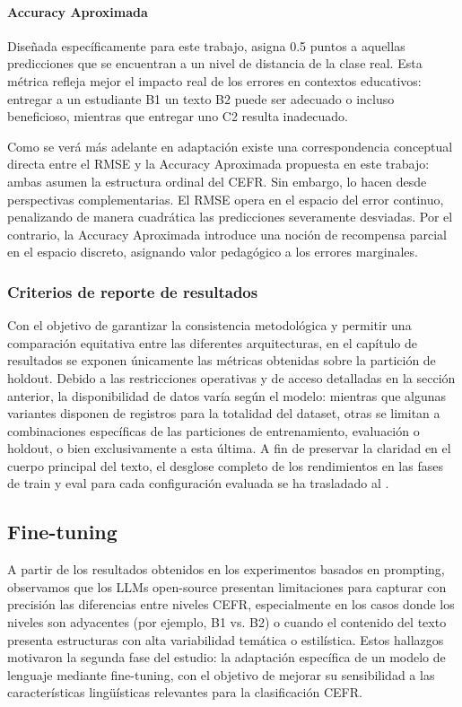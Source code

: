 \paragraph{Accuracy Aproximada}
Diseñada específicamente para este trabajo, asigna 0.5 puntos a aquellas predicciones que se encuentran a un nivel de distancia de la clase real. Esta métrica refleja mejor el impacto real de los errores en contextos educativos: entregar a un estudiante B1 un texto B2 puede ser adecuado o incluso beneficioso, mientras que entregar uno C2 resulta inadecuado.

Como se verá más adelante en  adaptación existe una correspondencia conceptual directa entre el RMSE y la Accuracy Aproximada propuesta en este trabajo: ambas asumen la estructura ordinal del CEFR. Sin embargo, lo hacen desde perspectivas complementarias. El RMSE opera en el espacio del error continuo, penalizando de manera cuadrática las predicciones severamente desviadas. Por el contrario, la Accuracy Aproximada introduce una noción de recompensa parcial en el espacio discreto, asignando valor pedagógico a los errores marginales.

\subsubsection*{Criterios de reporte de resultados}
Con el objetivo de garantizar la consistencia metodológica y permitir una comparación equitativa entre las diferentes arquitecturas, en el capítulo de resultados se exponen únicamente las métricas obtenidas sobre la partición de holdout. Debido a las restricciones operativas y de acceso detalladas en la sección anterior, la disponibilidad de datos varía según el modelo: mientras que algunas variantes disponen de registros para la totalidad del dataset, otras se limitan a combinaciones específicas de las particiones de entrenamiento, evaluación o holdout, o bien exclusivamente a esta última. A fin de preservar la claridad en el cuerpo principal del texto, el desglose completo de los rendimientos en las fases de train y eval para cada configuración evaluada se ha trasladado al .

\subsection{Fine-tuning}\label{subsection:clas_finetuning}
A partir de los resultados obtenidos en los experimentos basados en prompting, observamos que los LLMs open-source presentan limitaciones para capturar con precisión las diferencias entre niveles CEFR, especialmente en los casos donde los niveles son adyacentes (por ejemplo, B1 vs. B2) o cuando el contenido del texto presenta estructuras con alta variabilidad temática o estilística. Estos hallazgos motivaron la segunda fase del estudio: la adaptación específica de un modelo de lenguaje mediante fine-tuning, con el objetivo de mejorar su sensibilidad a las características lingüísticas relevantes para la clasificación CEFR.

